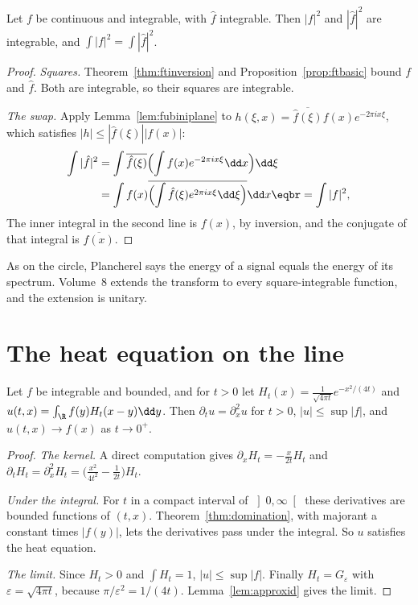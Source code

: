 \begin{theorem}[Plancherel]\label{thm:plancherel}
Let $f$ be continuous and integrable, with $\hat f$ integrable. Then $|f|^2$ and $|\hat f|^2$ are integrable, and $\int|f|^2=\int|\hat f|^2$.
\end{theorem}
\begin{proof}
\emph{Squares.} Theorem~\ref{thm:ftinversion} and Proposition~\ref{prop:ftbasic} bound $f$ and $\hat f$. Both are integrable, so their squares are integrable.

\emph{The swap.} Apply Lemma~\ref{lem:fubiniplane} to $h(\xi,x)=\overline{\hat f(\xi)}f(x)e^{-2\pi ix\xi}$, which satisfies $|h|\le|\hat f(\xi)||f(x)|$:
\[
\begin{aligned}\int|\hat f|^2&=\int\overline{\hat f(\xi)}\Bigl(\int f(x)e^{-2\pi ix\xi}\dd x\Bigr)\dd\xi\\&=\int f(x)\overline{\Bigl(\int\hat f(\xi)e^{2\pi ix\xi}\dd\xi\Bigr)}\dd x\eqbr=\int|f|^2,\end{aligned}
\]
The inner integral in the second line is $f(x)$, by inversion, and the conjugate of that integral is $\overline{f(x)}$.
\end{proof}

As on the circle, Plancherel says the energy of a signal equals the energy of its spectrum. Volume~8 extends the transform to every square-integrable function, and the extension is unitary.

\section{The heat equation on the line}

\begin{proposition}\label{prop:heatline}
Let $f$ be integrable and bounded, and for $t>0$ let $H_t(x)=\frac1{\sqrt{4\pi t}}e^{-x^2/(4t)}$ and $u(t,x)=\int_{\R}f(y)H_t(x-y)\dd y$. Then $\partial_tu=\partial_x^2u$ for
$t>0$, $|u|\le\sup|f|$, and $u(t,x)\to f(x)$ as $t\to0^+$.
\end{proposition}
\begin{proof}
\emph{The kernel.} A direct computation gives $\partial_xH_t=-\frac x{2t}H_t$ and $\partial_tH_t=\partial_x^2H_t=\bigl(\frac{x^2}{4t^2}-\frac1{2t}\bigr)H_t$.

\emph{Under the integral.} For $t$ in a compact interval of $\left]0,\infty\right[$ these derivatives are bounded functions of $(t,x)$. Theorem~\ref{thm:domination}, with majorant a constant times $|f(y)|$, lets the derivatives pass under the integral. So $u$ satisfies the heat equation.

\emph{The limit.} Since $H_t>0$ and $\int H_t=1$, $|u|\le\sup|f|$. Finally $H_t=G_\varepsilon$ with $\varepsilon=\sqrt{4\pi t}$, because $\pi/\varepsilon^2=1/(4t)$. Lemma~\ref{lem:approxid} gives the limit.
\end{proof}

